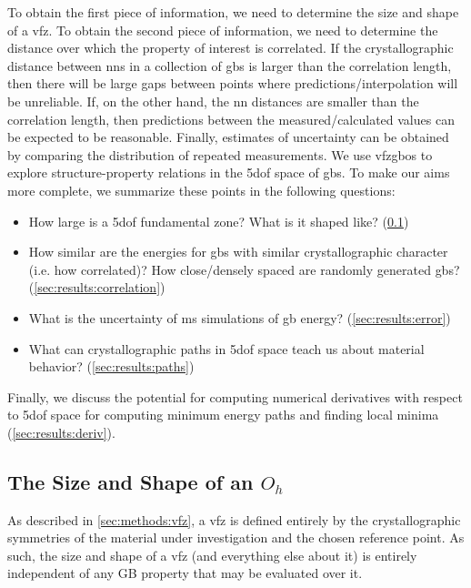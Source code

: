\documentclass[final,twocolumn,12pt]{elsarticle}
\begin{document}
    To obtain the first piece of information, we need to determine the size and shape of a \gls{vfz}. To obtain the second piece of information, we need to determine the distance over which the property of interest is correlated. If the crystallographic distance between \glspl{nn} in a collection of \glspl{gb} is larger than the correlation length, then there will be large gaps between points where predictions/interpolation will be unreliable. If, on the other hand, the \gls{nn} distances are smaller than the correlation length, then predictions between the measured/calculated values can be expected to be reasonable. Finally, estimates of uncertainty can be obtained by comparing the distribution of repeated measurements. We use \glspl{vfzgbo} to explore structure-property relations in the \gls{5dof} space of \glspl{gb}. To make our aims more complete, we summarize these points in the following questions:
	\begin{itemize}
		\item How large is a \gls{5dof} fundamental zone? What is it shaped like? (\cref{sec:results:dimensions})
		\item How similar are the energies for \glspl{gb} with similar crystallographic character (i.e. how correlated)? How close/densely spaced are randomly generated \glspl{gb}? (\cref{sec:results:correlation})
		\item What is the uncertainty of \gls{ms} simulations of \gls{gb} energy? (\cref{sec:results:error}) %
		\item What can crystallographic paths in \gls{5dof} space teach us about material behavior? (\cref{sec:results:paths})
	\end{itemize}
	
	Finally, we discuss the potential for computing numerical derivatives with respect to \gls{5dof} space for computing minimum energy paths and finding local minima (\cref{sec:results:deriv}).
	
	
	\subsection{The Size and Shape of an $O_h$ } \label{sec:results:dimensions}
	As described in \cref{sec:methods:vfz}, a \gls{vfz} is defined entirely by the crystallographic symmetries of the material under investigation and the chosen reference point. As such, the size and shape of a \gls{vfz} (and everything else about it) is entirely independent of any GB property that may be evaluated over it.
	
\end{document}
